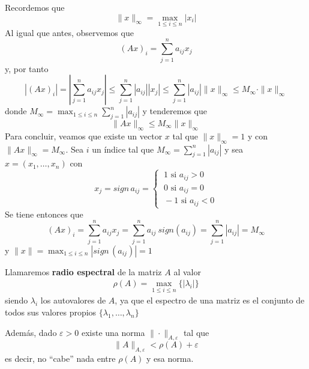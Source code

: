 \begin{ejem}
\begin{enumerate}
        Recordemos que 
        $$\|x\|_{\infty}=\max_{1\leq i\leq n}|x_i|$$
        Al igual que antes, observemos que
        $$(Ax)_i=\sum_{j=1}^n a_{ij} x_j$$
        y, por tanto
        $$|(Ax)_i|=\left|\sum_{j=1}^na_{ij} x_j\right|\leq \sum_{j=1}^n|a_{ij}| |x_j|\leq \sum_{j=1}^n|a_{ij}|\|x\|_{\infty}\leq M_{\infty}\cdot \|x\|_{\infty}$$
        donde $ \displaystyle M_{\infty}=\max_{1 \leq i \leq n} \sum_{j=1}^n|a_{ij}|$ y tenderemos que 
        $$\|Ax\|_{\infty} \leq M_{\infty} \|x\|_{\infty}$$
        Para concluir, veamos que existe un vector $x$ tal que $\|x\|_{\infty}=1$ y con $\|Ax\|_{\infty}=M_{\infty}$. Sea $i$ un índice tal que $M_{\infty}=\sum_{j=1}^n|a_{ij}|$ y sea $x=(x_1,\ldots,x_n)$ con 
        $$x_j=sign\, a_{ij}=\begin{cases}
            \: 1 \text{ si } a_{ij}>0 \\
            \: 0 \text{ si } a_{ij}=0 \\
            \: -1 \text{ si } a_{ij}<0 
        \end{cases}$$
        Se tiene entonces que
        $$(Ax)_{i}=\sum_{j=1}^na_{ij} x_j = \sum_{j=1}^na_{ij} \: sign(a_{ij})=\sum_{j=1}^n|a_{ij}|=M_{\infty}$$
        y $\|x\|=\max_{1\leq i\leq n}|sign\,(a_{ij})|=1$

       
    \end{enumerate}
    \end{ejem}
    \begin{defin}
    Llamaremos \textbf{radio espectral} de la matriz $A$ al valor
    \begin{align}
      \rho(A)=\max_{1 \leq i \leq n}\{|\lambda_i|\}
      \label{radio}
    \end{align}
    siendo $\lambda_i$ los autovalores de $A$, ya que el espectro de una matriz es el conjunto de todos sus valores propios $\{\lambda_1, \ldots, \lambda_n\}$
    \end{defin}
    \begin{obs}
    Además, dado $\varepsilon>0$ existe una norma $\|\cdot\|_{A, \varepsilon}$ tal que 
    $$\|A\|_{A, \varepsilon} < \rho(A)+\varepsilon$$
    es decir, no ``cabe'' nada entre $\rho(A)$ y esa norma.
    \end{obs}
    
